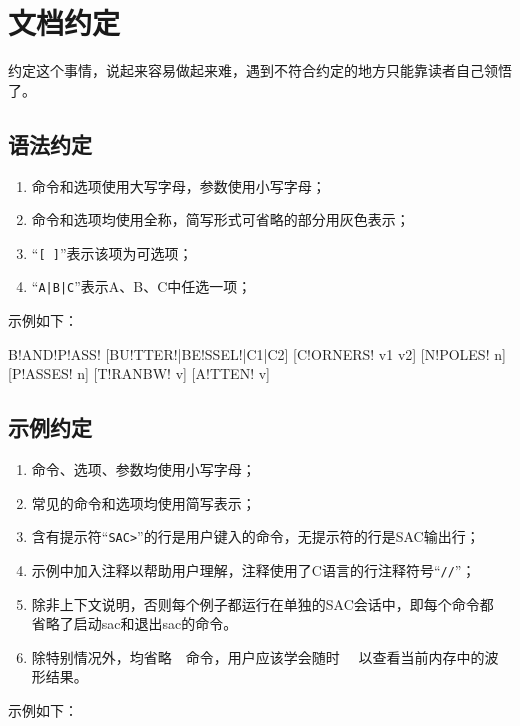 \section{文档约定}
约定这个事情，说起来容易做起来难，遇到不符合约定的地方只能靠读者自己领悟了。

\subsection*{语法约定}
\begin{enumerate}
\item 命令和选项使用大写字母，参数使用小写字母；
\item 命令和选项均使用全称，简写形式可省略的部分用灰色表示；
\item ``\lstinline{[ ]}''表示该项为可选项；
\item ``\lstinline{A|B|C}''表示A、B、C中任选一项；
\end{enumerate}

示例如下：
\begin{SACSTX}
B!AND!P!ASS! [BU!TTER!|BE!SSEL!|C1|C2] [C!ORNERS! v1 v2] [N!POLES! n] 
    [P!ASSES! n] [T!RANBW! v] [A!TTEN! v]
\end{SACSTX}

\subsection*{示例约定}
\begin{enumerate}
\item 命令、选项、参数均使用小写字母；
\item 常见的命令和选项均使用简写表示；
\item 含有提示符``\lstinline{SAC>}''的行是用户键入的命令，无提示符的行是SAC输出行；
\item 示例中加入注释以帮助用户理解，注释使用了C语言的行注释符号``\lstinline{//}''；
\item 除非上下文说明，否则每个例子都运行在单独的SAC会话中，即每个命令都
    省略了启动sac和退出sac的命令。
\item 除特别情况外，均省略~~命令，用户应该学会随时~~
    以查看当前内存中的波形结果。
\end{enumerate}

示例如下：
